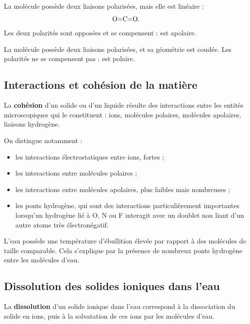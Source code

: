 \documentclass[11pt,a4paper]{article}
\begin{document}
\begin{exemplebox}
La molécule  possède deux liaisons  polarisées, mais elle est linéaire :
\[
\ce{O=C=O}.
\]
Les deux polarités sont opposées et se compensent :  est apolaire.

La molécule  possède deux liaisons  polarisées, et sa géométrie est coudée. Les polarités ne se compensent pas :  est polaire.
\end{exemplebox}

\subsection{Interactions et cohésion de la matière}

\begin{definitionbox}
La \textbf{cohésion} d'un solide ou d'un liquide résulte des interactions entre les entités microscopiques qui le constituent : ions, molécules polaires, molécules apolaires, liaisons hydrogène.
\end{definitionbox}

\begin{retenirbox}
On distingue notamment :
\begin{itemize}
\item les interactions électrostatiques entre ions, fortes ;
\item les interactions entre molécules polaires ;
\item les interactions entre molécules apolaires, plus faibles mais nombreuses ;
\item les ponts hydrogène, qui sont des interactions particulièrement importantes lorsqu'un hydrogène lié à \ce O, \ce N ou \ce F interagit avec un doublet non liant d'un autre atome très électronégatif.
\end{itemize}
\end{retenirbox}

\begin{exemplebox}
L'eau possède une température d'ébullition élevée par rapport à des molécules de taille comparable. Cela s'explique par la présence de nombreux ponts hydrogène entre les molécules d'eau.
\end{exemplebox}

\subsection{Dissolution des solides ioniques dans l'eau}

\begin{definitionbox}
La \textbf{dissolution} d'un solide ionique dans l'eau correspond à la dissociation du solide en ions, puis à la solvatation de ces ions par les molécules d'eau.
\end{definitionbox}
\end{document}

